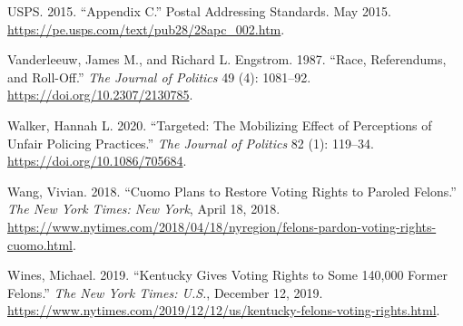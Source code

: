 \documentclass[
  12pt,
]{article}
\newlength{\cslhangindent}
\newenvironment{cslreferences}%
  {\setlength{\parindent}{0pt}%
  \everypar{\setlength{\hangindent}{\cslhangindent}}\ignorespaces}%
  {\par}
\begin{document}
\begin{cslreferences}
\leavevmode\hypertarget{ref-USPS2015}{}%
USPS. 2015. ``Appendix C.'' Postal Addressing Standards. May 2015. \url{https://pe.usps.com/text/pub28/28apc_002.htm}.

\leavevmode\hypertarget{ref-Vanderleeuw1987}{}%
Vanderleeuw, James M., and Richard L. Engstrom. 1987. ``Race, Referendums, and Roll-Off.'' \emph{The Journal of Politics} 49 (4): 1081--92. \url{https://doi.org/10.2307/2130785}.

\leavevmode\hypertarget{ref-Walker2020}{}%
Walker, Hannah L. 2020. ``Targeted: The Mobilizing Effect of Perceptions of Unfair Policing Practices.'' \emph{The Journal of Politics} 82 (1): 119--34. \url{https://doi.org/10.1086/705684}.

\leavevmode\hypertarget{ref-Wang2018}{}%
Wang, Vivian. 2018. ``Cuomo Plans to Restore Voting Rights to Paroled Felons.'' \emph{The New York Times: New York}, April 18, 2018. \url{https://www.nytimes.com/2018/04/18/nyregion/felons-pardon-voting-rights-cuomo.html}.

\leavevmode\hypertarget{ref-Wines2019}{}%
Wines, Michael. 2019. ``Kentucky Gives Voting Rights to Some 140,000 Former Felons.'' \emph{The New York Times: U.S.}, December 12, 2019. \url{https://www.nytimes.com/2019/12/12/us/kentucky-felons-voting-rights.html}.
\end{cslreferences}
\end{document}
